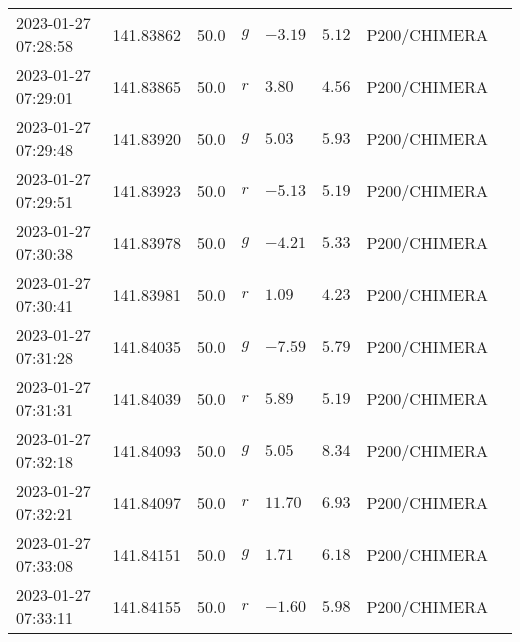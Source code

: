 \documentclass{nature_plusfigure}
\begin{document}
\begin{supplement}
\begin{center}
\begin{longtable}{llllllll}
2023-01-27 07:28:58 & 141.83862 & 50.0 & $g$ & $-3.19$ & $5.12$ & P200/CHIMERA &  \\ 
2023-01-27 07:29:01 & 141.83865 & 50.0 & $r$ & $3.80$ & $4.56$ & P200/CHIMERA &  \\ 
2023-01-27 07:29:48 & 141.83920 & 50.0 & $g$ & $5.03$ & $5.93$ & P200/CHIMERA &  \\ 
2023-01-27 07:29:51 & 141.83923 & 50.0 & $r$ & $-5.13$ & $5.19$ & P200/CHIMERA &  \\ 
2023-01-27 07:30:38 & 141.83978 & 50.0 & $g$ & $-4.21$ & $5.33$ & P200/CHIMERA &  \\ 
2023-01-27 07:30:41 & 141.83981 & 50.0 & $r$ & $1.09$ & $4.23$ & P200/CHIMERA &  \\ 
2023-01-27 07:31:28 & 141.84035 & 50.0 & $g$ & $-7.59$ & $5.79$ & P200/CHIMERA &  \\ 
2023-01-27 07:31:31 & 141.84039 & 50.0 & $r$ & $5.89$ & $5.19$ & P200/CHIMERA &  \\ 
2023-01-27 07:32:18 & 141.84093 & 50.0 & $g$ & $5.05$ & $8.34$ & P200/CHIMERA &  \\ 
2023-01-27 07:32:21 & 141.84097 & 50.0 & $r$ & $11.70$ & $6.93$ & P200/CHIMERA &  \\ 
2023-01-27 07:33:08 & 141.84151 & 50.0 & $g$ & $1.71$ & $6.18$ & P200/CHIMERA &  \\ 
2023-01-27 07:33:11 & 141.84155 & 50.0 & $r$ & $-1.60$ & $5.98$ & P200/CHIMERA &  \\ 
\hline 
\end{longtable} 
\end{center} 



\clearpage


\end{supplement}
\end{document}
